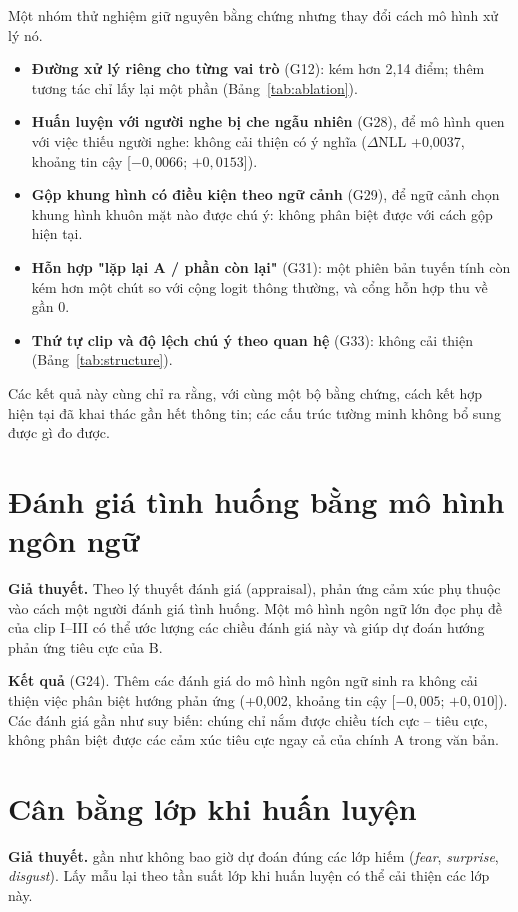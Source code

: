 Một nhóm thử nghiệm giữ nguyên bằng chứng nhưng thay đổi cách mô hình xử lý nó.
\begin{itemize}
	\item \textbf{Đường xử lý riêng cho từng vai trò} (G12): kém hơn \model{} 2,14 điểm; thêm tương tác chỉ lấy lại một phần (Bảng~\ref{tab:ablation}).
	\item \textbf{Huấn luyện với người nghe bị che ngẫu nhiên} (G28), để mô hình quen với việc thiếu người nghe: không cải thiện có ý nghĩa ($\Delta$NLL +0,0037, khoảng tin cậy [$-0{,}0066$; $+0{,}0153$]).
	\item \textbf{Gộp khung hình có điều kiện theo ngữ cảnh} (G29), để ngữ cảnh chọn khung hình khuôn mặt nào được chú ý: không phân biệt được với cách gộp hiện tại.
	\item \textbf{Hỗn hợp "lặp lại A / phần còn lại"} (G31): một phiên bản tuyến tính còn kém hơn một chút so với cộng logit thông thường, và cổng hỗn hợp thu về gần 0.
	\item \textbf{Thứ tự clip và độ lệch chú ý theo quan hệ} (G33): không cải thiện (Bảng~\ref{tab:structure}).
\end{itemize}
Các kết quả này cùng chỉ ra rằng, với cùng một bộ bằng chứng, cách kết hợp hiện tại đã khai thác gần hết thông tin; các cấu trúc tường minh không bổ sung được gì đo được.

\section{Đánh giá tình huống bằng mô hình ngôn ngữ}

\textbf{Giả thuyết.} Theo lý thuyết đánh giá (appraisal), phản ứng cảm xúc phụ thuộc vào cách một người đánh giá tình huống. Một mô hình ngôn ngữ lớn đọc phụ đề của clip I--III có thể ước lượng các chiều đánh giá này và giúp dự đoán hướng phản ứng tiêu cực của B.

\textbf{Kết quả} (G24). Thêm các đánh giá do mô hình ngôn ngữ sinh ra không cải thiện việc phân biệt hướng phản ứng (+0,002, khoảng tin cậy [$-0{,}005$; $+0{,}010$]). Các đánh giá gần như suy biến: chúng chỉ nắm được chiều tích cực -- tiêu cực, không phân biệt được các cảm xúc tiêu cực ngay cả của chính A trong văn bản.

\section{Cân bằng lớp khi huấn luyện}

\textbf{Giả thuyết.} \model{} gần như không bao giờ dự đoán đúng các lớp hiếm (\emph{fear}, \emph{surprise}, \emph{disgust}). Lấy mẫu lại theo tần suất lớp khi huấn luyện có thể cải thiện các lớp này.

